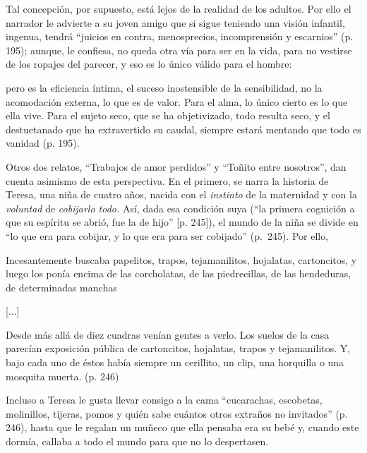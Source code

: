\documentclass[14pt,twoside,final]{extbook} %
\begin{document}
Tal concepción, por supuesto, está lejos de la realidad de los adultos. Por ello el narrador le advierte a su joven amigo que si sigue teniendo una visión infantil, ingenua, tendrá ``juicios en contra, menosprecios, incomprensión y escarnios'' (p. 195); aunque, le confiesa, no queda otra vía para ser en la vida, para no vestirse de los ropajes del parecer, y eso es lo único válido para el
hombre:
\begin{quoting}
pero es la eficiencia íntima, el suceso inostensible de la sensibilidad, no la acomodación externa, lo que es de valor. Para el alma, lo único cierto es lo que ella vive. Para el sujeto seco, que se ha objetivizado, todo resulta seco, y el destuetanado que ha extravertido su caudal, siempre estará mentando que todo es vanidad (p. 195).
\end{quoting}
Otros dos relatos, ``Trabajos de amor perdidos'' y ``Toñito entre nosotros'', dan cuenta asimismo de esta perspectiva. En el primero, se narra la historia de Teresa, una niña de cuatro años, nacida con el \emph{instinto} de la maternidad y con la \emph{voluntad} de \emph{cobijarlo todo.} Así, dada esa condición suya (``la primera cognición a que su espíritu se abrió, fue la de hijo'' [p. 245]), el mundo de la niña se divide en ``lo que era para cobijar, y lo que era para ser cobijado'' (p.~245). Por ello,
\begin{quoting}
Incesantemente buscaba papelitos, trapos, tejamanilitos, hojalatas, cartoncitos, y luego los ponía encima de las corcholatas, de las piedrecillas, de las hendeduras, de determinadas manchas

\centerline{[...]}

Desde más allá de diez cuadras venían gentes a verlo. Los suelos de la casa parecían exposición pública de cartoncitos, hojalatas, trapos y tejamanilitos. Y, bajo cada uno de éstos había siempre un cerillito, un clip, una horquilla o una mosquita muerta. (p. 246)
\end{quoting} 
Incluso a Teresa le gusta llevar consigo a la cama ``cucarachas, escobetas, molinillos, tijeras, pomos y quién sabe cuántos otros extraños no invitados'' (p. 246), hasta que le regalan un muñeco que ella pensaba era su bebé y, cuando este dormía, callaba a todo el mundo para que no lo despertasen.
\end{document}
